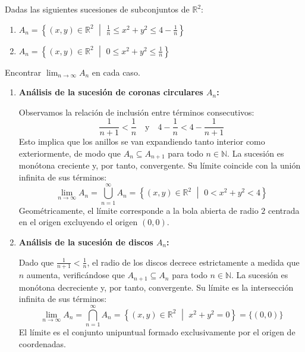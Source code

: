 \newpage
\begin{problema}
Dadas las siguientes sucesiones de subconjuntos de $\mathbb{R}^2$:
\begin{enumerate}[label=\alph*)]
    \item $A_n = \left\{ (x,y) \in \mathbb{R}^2 \,\,\middle|\,\, \frac{1}{n} \le x^2 + y^2 \le 4 - \frac{1}{n} \right\}$
    \item $A_n = \left\{ (x,y) \in \mathbb{R}^2 \,\,\middle|\,\, 0 \le x^2 + y^2 \le \frac{1}{n} \right\}$
\end{enumerate}
Encontrar $\displaystyle \lim_{n \to \infty} A_n$ en cada caso.

\tcblower

\begin{enumerate}[label=\alph*)]
    \item \textbf{Análisis de la sucesión de coronas circulares $A_n$:}
    
    Observamos la relación de inclusión entre términos consecutivos:
    \[
        \frac{1}{n+1} < \frac{1}{n} \quad \text{y} \quad 4 - \frac{1}{n} < 4 - \frac{1}{n+1}
    \]
    Esto implica que los anillos se van expandiendo tanto interior como exteriormente, de modo que $A_n \subseteq A_{n+1}$ para todo $n \in \mathbb{N}$. La sucesión es monótona creciente y, por tanto, convergente. Su límite coincide con la unión infinita de sus términos:
    \[
        \lim_{n \to \infty} A_n = \bigcup_{n=1}^\infty A_n = \left\{ (x,y) \in \mathbb{R}^2 \,\,\middle|\,\, 0 < x^2 + y^2 < 4 \right\}
    \]
    Geométricamente, el límite corresponde a la bola abierta de radio $2$ centrada en el origen excluyendo el origen $(0,0)$.

    \item \textbf{Análisis de la sucesión de discos $A_n$:}
    
    Dado que $\frac{1}{n+1} < \frac{1}{n}$, el radio de los discos decrece estrictamente a medida que $n$ aumenta, verificándose que $A_{n+1} \subseteq A_n$ para todo $n \in \mathbb{N}$. La sucesión es monótona decreciente y, por tanto, convergente. Su límite es la intersección infinita de sus términos:
    \[
        \lim_{n \to \infty} A_n = \bigcap_{n=1}^\infty A_n = \left\{ (x,y) \in \mathbb{R}^2 \,\,\middle|\,\, x^2 + y^2 = 0 \right\} = \{(0,0)\}
    \]
    El límite es el conjunto unipuntual formado exclusivamente por el origen de coordenadas.
\end{enumerate}
\end{problema}
